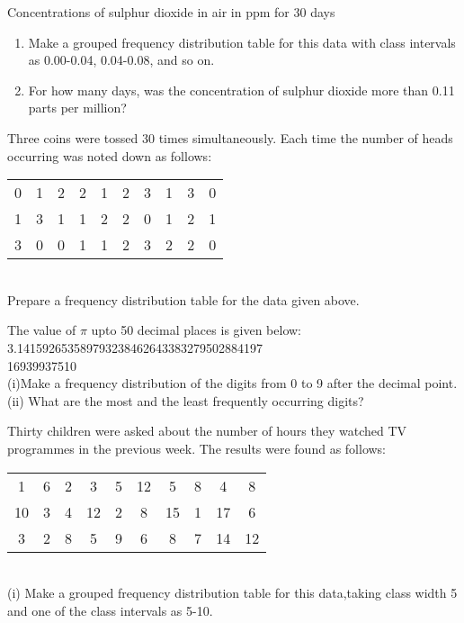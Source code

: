 \begin{table}[ht!]
\centering

\caption{Concentrations of sulphur dioxide in air in ppm for 30 days}
\label{table:sulphurdioxide_concentration}
\end{table}
\begin{enumerate}
\item Make a grouped frequency distribution table for this data with class intervals as 0.00-0.04, 0.04-0.08, and so on.
\item  For how many days, was the concentration of sulphur dioxide more than 0.11 parts per million?
\end{enumerate}
\solution

\item Three coins were tossed 30 times simultaneously. Each time the number of heads occurring was noted down as follows:\\
\begin{tabular}{ cccccccccc } 
 0 &1 &2 &2 &1 &2 &3 &1 &3 &0  \\ 
 1 &3 &1 &1 &2 &2 &0 &1 &2 &1\\ 
 3 &0 &0 &1 &1 &2 &3 &2 &2 &0\\ 
\end{tabular}\\
Prepare a frequency distribution table for the data given above.\\
\item The value of $\pi$ upto 50 decimal places is given below:
3.141592653589793238462643383279502884197\\
16939937510\\
(i)Make a frequency distribution of the digits from 0 to 9 after the decimal point.\\
(ii) What are the most and the least frequently occurring digits?\\
\item Thirty children were asked about the number of hours they watched TV programmes in the previous week. The results were found as follows:\\
\begin{tabular}{ cccccccccc } 
 1 &6 &2 &3 &5 &12 &5 &8 &4 &8  \\ 
 10 &3 &4 &12 &2 &8 &15 &1 &17 &6\\ 
 3 &2 &8 &5 &9 &6 &8 &7 &14 &12\\ 
\end{tabular}\\
(i) Make a grouped frequency distribution table for this data,taking class width 5 and one of the class intervals as 5-10.\\
